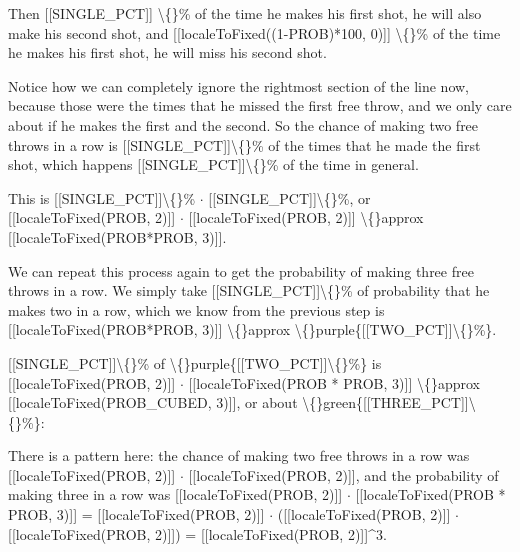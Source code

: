 \documentclass{article}
\begin{document}
\begin{itemize}
                    Then [[SINGLE\_PCT]] \textbackslash\{\}\% of
                    the time he makes his first shot, he will also make his second shot, and
                    [[localeToFixed((1-PROB)*100, 0)]] \textbackslash\{\}\% of the time he makes his
                    first shot, he will miss his second shot.
                    
                
                
                    Notice how we can completely ignore the rightmost section of the line now, because those were the times that
                    he missed the first free throw, and we only care about if he makes the first and the second.
                    So the chance of making two free throws in a row is [[SINGLE\_PCT]]\textbackslash\{\}\% of the times
                    that he made the first shot, which happens [[SINGLE\_PCT]]\textbackslash\{\}\% of the time in general.
                
                
                    This is [[SINGLE\_PCT]]\textbackslash\{\}\% $\cdot$ [[SINGLE\_PCT]]\textbackslash\{\}\%, or
                    [[localeToFixed(PROB, 2)]] $\cdot$ [[localeToFixed(PROB, 2)]] \textbackslash\{\}approx [[localeToFixed(PROB*PROB, 3)]].
                
                
                    
                        We can repeat this process again to get the probability of making three free throws in a row. We simply take
                        [[SINGLE\_PCT]]\textbackslash\{\}\% of probability that he makes two in a row, which we know from the previous step is
                        [[localeToFixed(PROB*PROB, 3)]] \textbackslash\{\}approx \textbackslash\{\}purple\{[[TWO\_PCT]]\textbackslash\{\}\%\}.
                    
                    
                    
                        [[SINGLE\_PCT]]\textbackslash\{\}\% of \textbackslash\{\}purple\{[[TWO\_PCT]]\textbackslash\{\}\%\} is
                        [[localeToFixed(PROB, 2)]] $\cdot$ [[localeToFixed(PROB * PROB, 3)]] \textbackslash\{\}approx 
                        [[localeToFixed(PROB\_CUBED, 3)]], or
                        about \textbackslash\{\}green\{[[THREE\_PCT]]\textbackslash\{\}\%\}:
                    
                    
                
                
                    There is a pattern here: the chance of making two free throws in a row was
                    [[localeToFixed(PROB, 2)]] $\cdot$ [[localeToFixed(PROB, 2)]], and the probability of making
                    three in a row was [[localeToFixed(PROB, 2)]] $\cdot$ [[localeToFixed(PROB * PROB, 3)]] =
                    [[localeToFixed(PROB, 2)]] $\cdot$ ([[localeToFixed(PROB, 2)]] $\cdot$ [[localeToFixed(PROB, 2)]])
                    = [[localeToFixed(PROB, 2)]]\textasciicircum{}3.
                

\end{itemize}
\end{document}
